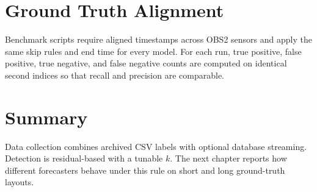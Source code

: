 \section{Ground Truth Alignment}
Benchmark scripts require aligned timestamps across OBS2 sensors and apply the same skip rules and end time for every model. For each run, true positive, false positive, true negative, and false negative counts are computed on identical second indices so that recall and precision are comparable.

\section{Summary}
Data collection combines archived CSV labels with optional database streaming. Detection is residual-based with a tunable $k$. The next chapter reports how different forecasters behave under this rule on short and long ground-truth layouts.
